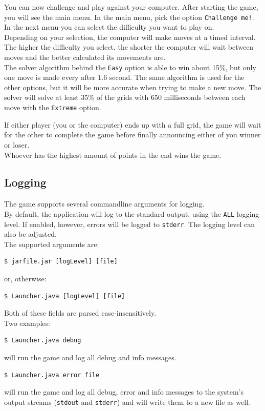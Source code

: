 \documentclass[a4paper,11pt,report]{scrartcl}
\begin{document}
You can now challenge and play against your computer. After starting the game, you will see the main menu. In the main menu, pick the option \texttt{Challenge me!}. In the next menu you can select the difficulty you want to play on.\\

Depending on your selection, the computer will make moves at a timed interval. The higher the difficulty you select, the shorter the computer will wait between moves and the better calculated its movements are.\\

The solver algorithm behind the \texttt{Easy} option is able to win about 15\%, but only one move is made every after 1.6 second. The same algorithm is used for the other options, but it will be more accurate when trying to make a new move. The solver will solve at least 35\% of the grids with 650 milliseconds between each move with the \texttt{Extreme} option.

If either player (you or the computer) ends up with a full grid, the game will wait for the other to complete the game before finally announcing either of you winner or loser.\\

Whoever has the highest amount of points in the end wins the game.

\subsection{Logging}
The game supports several commandline arguments for logging.\\

By default, the application will log to the standard output, using the
\texttt{ALL} logging level. If enabled, however, errors will be logged to
\texttt{stderr}. The logging level can also be adjusted.\\

The supported arguments are:
\begin{verbatim}
$ jarfile.jar [logLevel] [file]
\end{verbatim}
or, otherwise:
\begin{verbatim}
$ Launcher.java [logLevel] [file]
\end{verbatim}
Both of these fields are parsed case-insensitively.\\

Two examples:
\begin{verbatim}
$ Launcher.java debug
\end{verbatim}
will run the game and log all debug and info messages. 
\begin{verbatim}
$ Launcher.java error file
\end{verbatim}
will run the game and log all debug, error and info messages to the system's
output streams (\texttt{stdout} and \texttt{stderr}) and will write them to a
new file as well.\\
\end{document}
